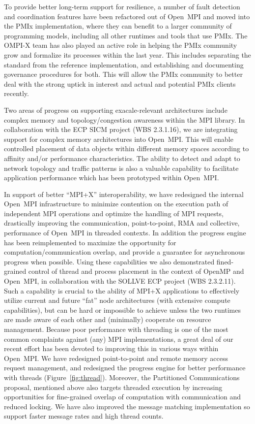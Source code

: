 To provide better long-term support for resilience, a number of fault detection and coordination features have been refactored out of Open~MPI and moved into the PMIx implementation, where they can benefit to a larger community of programming models, including all other runtimes and tools that use PMIx.  The OMPI-X team has also played an active role in helping the PMIx community grow and formalize its processes within the last year.  This includes separating the standard from the reference implementation, and establishing and documenting governance procedures for both.  This will allow the PMIx community to better deal with the strong uptick in interest and actual and potential PMIx clients recently.

Two areas of progress on supporting exacale-relevant architectures include complex memory and topology/congestion awareness within the MPI library. In collaboration with the ECP SICM project (WBS 2.3.1.16), we are integrating support for complex memory architectures into Open~MPI.  This will enable controlled placement of data objects within different memory spaces according to affinity and/or performance characteristics.  The ability to detect and adapt to network topology and traffic patterns is also a valuable capability to facilitate application performance which has been prototyped within Open~MPI.

In support of better ``MPI+X'' interoperability, we have redesigned the internal Open~MPI infrastructure to minimize contention on the execution path of independent MPI operations and optimize the handling of MPI requests, drastically improving the communication, point-to-point, RMA and collective, performance of Open~MPI in threaded contexts. In addition the progress engine has been reimplemented to maximize the opportunity for computation/communication overlap, and provide a guarantee for asynchronous progress when possible. Using these capabilities we also demonstrated fined-grained control of thread and process placement in the context of OpenMP and Open~MPI, in collaboration with the SOLLVE ECP project (WBS 2.3.2.11). Such a capability is crucial to the ability of MPI+X applications to effectively utilize current and future ``fat'' node architectures (with extensive compute capabilities), but can be hard or impossible to achieve unless the two runtimes are made aware of each other and (minimally) cooperate on resource management.
%
Because poor performance with threading is one of the most common
complaints against (any) MPI implementations, a great deal of our
recent effort has been devoted to improving this in various ways
within Open~MPI.  We have redesigned point-to-point and remote
memory access request management, and redesigned the progress engine
for better performance with threads (Figure~\ref{fig:thread}).
Moreover, the Partitioned Communications proposal, mentioned above also targets threaded execution by increasing opportunities for fine-grained overlap of computation with communication and reduced locking.  We have also improved the message matching implementation so support faster message rates and high thread counts.

